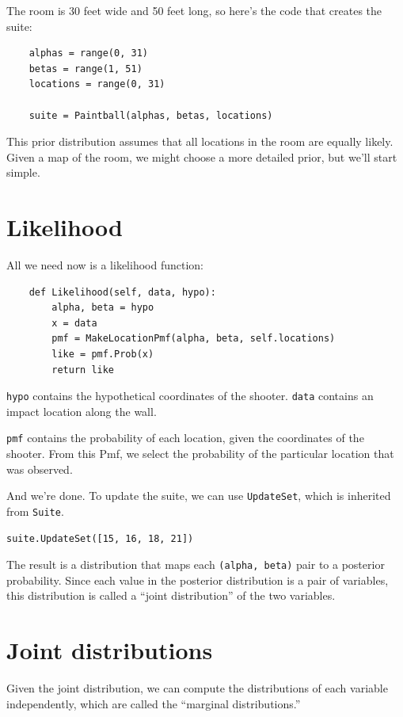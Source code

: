 \documentclass[12pt]{book}
\begin{document}
The room is 30 feet wide and 50 feet long, so here's the code that
creates the suite:

\begin{verbatim}
    alphas = range(0, 31)
    betas = range(1, 51)
    locations = range(0, 31)

    suite = Paintball(alphas, betas, locations)
\end{verbatim}

This prior distribution assumes that all locations in the room are
equally likely.  Given a map of the room, we might choose a more
detailed prior, but we'll start simple.


\section{Likelihood}

All we need now is a likelihood function:

\begin{verbatim}
    def Likelihood(self, data, hypo):
        alpha, beta = hypo
        x = data
        pmf = MakeLocationPmf(alpha, beta, self.locations)
        like = pmf.Prob(x)
        return like
\end{verbatim}

{\tt hypo} contains the hypothetical coordinates of the shooter.
{\tt data} contains an impact location along the wall.

{\tt pmf} contains the probability of each location, given the
coordinates of the shooter.  From this Pmf, we select the probability
of the particular location that was observed.

And we're done.  To update the suite, we can use {\tt UpdateSet},
which is inherited from {\tt Suite}.

\begin{verbatim}
suite.UpdateSet([15, 16, 18, 21])
\end{verbatim}

The result is a distribution that maps each {\tt (alpha, beta)} pair
to a posterior probability.  Since each value in the posterior
distribution is a pair of variables, this distribution is called a
``joint distribution'' of the two variables.


\section{Joint distributions}

Given the joint distribution, we can compute the distributions
of each variable independently, which are called the ``marginal
distributions.''
\end{document}
